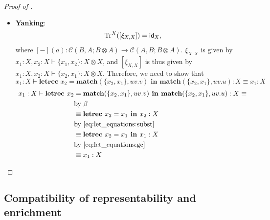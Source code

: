 \begin{proof}[Proof of ]
\begin{itemize}
Therefore, by $\eta$-equation, we have that
\[
\textbf{match}(f(c,x), \alpha\beta.\{g(a), \alpha\}) \equiv \{g(a), \textbf{match}(f(c,x), \alpha\beta.\alpha)\},
\]
and can write the left-hand side as
\begin{align*}
\textbf{letrec } x &= \textbf{match}(f(c,x), \alpha\beta.\beta) \textbf{ in }\\
&\{g(a), \textbf{match}(f(c,x), \alpha\beta.\alpha)\}\\
&\text{by \cref{eq:let_equations:float-tensor-R}}\\
&\equiv \{g(a), \textbf{letrec } x = \textbf{match}(f(c,x), \alpha\beta.\beta) \textbf{ in } \textbf{match}(f(c,x), \alpha\beta.\alpha)\} 
\end{align*}
Up to $\alpha$-equivalence, this is exactly the right-hand side.
\item \textbf{Yanking}: 
\[
\text{Tr}^{X}([\xi_{X,X}]) = \textsf{id}_{X},
\]
where $[-](a) : \mathcal{C}(B,A;B \otimes A) \to \mathcal{C}(A,B;B \otimes A)$.
$\xi_{X,X}$ is given by $x_1 : X, x_2 : X \vdash \{x_1, x_2\} : X \otimes X$, and $[\xi_{X,X}]$ is thus given by $x_1 : X, x_2 : X \vdash \{x_2, x_1\} : X \otimes X$.
Therefore, we need to show that
\[
x_1 : X \vdash \textbf{letrec } x_2 = \textbf{match}(\{x_2,x_1\}, uv.v) \textbf{ in } \textbf{match}(\{x_2,x_1\}, uv.u) : X \equiv x_1 : X
\]
\begin{align*}
x_1 : X \vdash \textbf{letrec } x_2 &= \textbf{match}(\{x_2,x_1\}, uv.v) \textbf{ in } \textbf{match}(\{x_2,x_1\}, uv.u) : X \equiv\\
&\text{by $\beta$}\\
&\equiv \textbf{letrec } x_2 = x_1 \textbf{ in } x_2 : X\\
&\text{by \cref{eq:let_equations:subst}}\\
&\equiv \textbf{letrec } x_2 = x_1 \textbf{ in } x_1 : X\\
&\text{by \cref{eq:let_equations:gc}}\\ 
&\equiv x_1 : X
\end{align*}
\end{itemize}
\end{proof}


\subsection{Compatibility of representability and enrichment}

